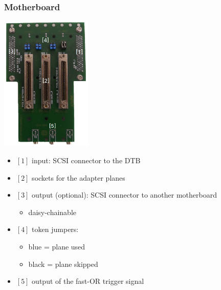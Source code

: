 \documentclass[9pt]{beamer}
\begin{document}
\begin{frame}
	\frametitle{Motherboard}
	\begin{center}
		\begin{minipage}{4.6cm}
			\centering
			\includegraphics[width=4.35cm]{Pics/Motherboard}
		\end{minipage}
		\hspace*{2pt}
		\begin{minipage}[c][.7\textheight]{6cm}
			\begin{itemize}
				\setlength{\itemsep}{\fill}
				\item $[1]$ input: SCSI connector to the DTB
				\item $[2]$ sockets for the adapter planes
				\item $[3]$ output (optional): SCSI connector to another motherboard
				\begin{itemize}
					\item daisy-chainable
				\end{itemize}
				\item $[4]$ token jumpers:
				\begin{itemize}
					\item blue\hspace{4pt} = plane used
					\item black = plane skipped
				\end{itemize}
				\item $[5]$ output of the fast-OR trigger signal 
			\end{itemize}
		\end{minipage}\no\s
	\end{center}
\end{frame}
\end{document}
